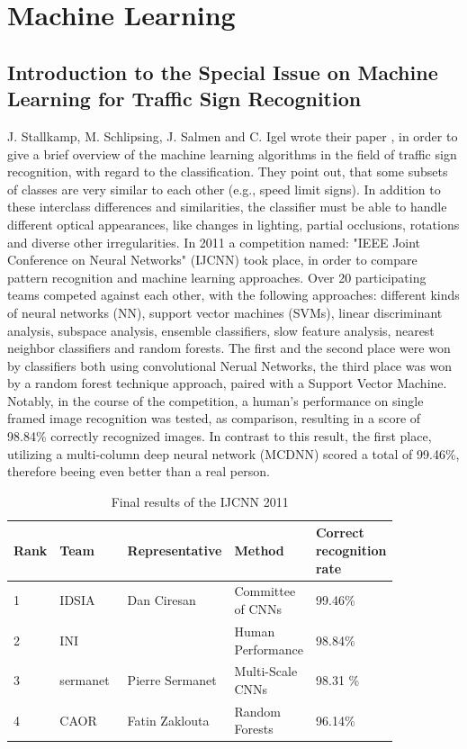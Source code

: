 \section{Machine Learning}
\subsection{Introduction to the Special Issue on Machine Learning for Traffic Sign Recognition}\label{ssec:machinelearning}

J. Stallkamp, M. Schlipsing, J. Salmen and C. Igel wrote their paper \cite{machinelearning}, in order to give a brief overview of the machine learning algorithms in the field of traffic sign recognition, with regard to the classification. \newline
They point out, that some subsets of classes are
very similar to each other (e.g., speed limit signs). In addition to these interclass differences and similarities, the classifier must be able to handle different optical appearances, like changes in lighting, partial occlusions, rotations and diverse other irregularities. In 2011 a competition named: "IEEE Joint
Conference on Neural Networks" (IJCNN) \cite{ijcnn} took place, in order to compare pattern recognition and machine learning approaches. Over 20 participating teams competed against each other, with the following approaches: different kinds of neural
networks (NN), support vector machines (SVMs), linear discriminant analysis, subspace analysis, ensemble classifiers, slow feature analysis, nearest neighbor classifiers and random forests. \newline
The first and the second place were won by classifiers both using convolutional Nerual Networks, the third place was won by a random forest technique approach, paired with a Support Vector Machine. Notably, in the course of the competition, a human's performance on single framed image recognition was tested, as comparison, resulting in a score of 98.84\% correctly recognized images. In contrast to this result, the first place, utilizing a multi-column deep neural network (MCDNN) scored a total of 99.46\%, therefore beeing even better than a real person. 

\begin{table}[h]
	\begin{tabular}{||p{0.05\linewidth} | p{0.2\linewidth}|p{0.2\linewidth}|p{0.2\linewidth}|p{0.2\linewidth}||}
		\hline
		Rank  &	Team & Representative &	Method &	Correct recognition rate\\
		\hline
		\hline
		1 & IDSIA & Dan Ciresan & Committee of CNNs &	99.46\% \\
		\hline
		2 &	INI & & Human Performance & 98.84\% \\
		\hline
		3 & sermanet & Pierre Sermanet & Multi-Scale CNNs & 98.31 \% \\
		\hline
		4 & CAOR & Fatin Zaklouta & Random Forests &	96.14\% \\
		\hline
		
	\end{tabular}
	\caption{Final results of the IJCNN 2011}
	\label{table:icjnn2011}
	
\end{table}


